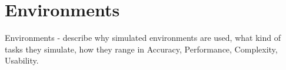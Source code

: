 \section{Environments}

Environments - describe why simulated environments are used, what kind of
tasks they simulate, how they range in Accuracy, Performance, Complexity,
Usability.

%
%
